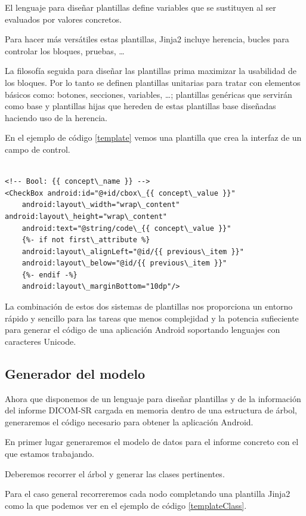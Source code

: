 El lenguaje para diseñar plantillas define variables que se sustituyen al ser evaluados por valores concretos.\par
Para hacer más versátiles estas plantillas, Jinja2 incluye herencia, bucles para controlar los bloques, pruebas,  \ldots\par
La filosofía seguida para diseñar las plantillas prima maximizar la usabilidad de los bloques. Por lo tanto se definen plantillas unitarias para tratar con elementos básicos como: botones, secciones, variables, \ldots ; plantillas genéricas que servirán como base y plantillas hijas que hereden de estas plantillas base diseñadas haciendo uso de la herencia.\par
En el ejemplo de código \ref{template} vemos una plantilla que crea la interfaz de un campo de control.\medskip\par

\lstset{escapechar=@,style=python}

\begin{lstlisting}[label=template,caption=Plantilla Jinja2]

<!-- Bool: {{ concept\_name }} -->           
<CheckBox android:id="@+id/cbox\_{{ concept\_value }}"
    android:layout\_width="wrap\_content" android:layout\_height="wrap\_content"
    android:text="@string/code\_{{ concept\_value }}"
    {%- if not first\_attribute %}
    android:layout\_alignLeft="@id/{{ previous\_item }}" 
    android:layout\_below="@id/{{ previous\_item }}"
    {%- endif -%}
    android:layout\_marginBottom="10dp"/>

\end{lstlisting}

La combinación de estos dos sistemas de plantillas nos proporciona un entorno rápido y sencillo para las tareas que menos complejidad y la potencia sufieciente para generar el código de una aplicación Android soportando lenguajes con caracteres Unicode.\par

\subsection{Generador del modelo}\label{sec:generacion_modelo}
Ahora que disponemos de un lenguaje para diseñar plantillas y de la información del informe DICOM-SR cargada en memoria dentro de una estructura de árbol, generaremos el código necesario para obtener la aplicación Android.\medskip\par

En primer lugar generaremos el modelo de datos para el informe concreto con el que estamos trabajando.\par
Deberemos recorrer el árbol y generar las clases pertinentes.\par
Para el caso general recorreremos cada nodo completando una plantilla Jinja2 como la que podemos ver en el ejemplo de código \ref{templateClass}.\par
\lstset{escapechar=@,style=java}

